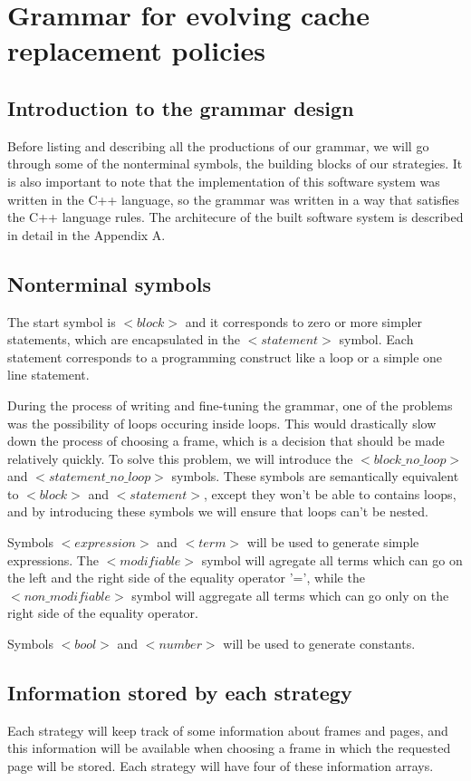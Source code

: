 \section{Grammar for evolving cache replacement policies}
\subsection{Introduction to the grammar design}
Before listing and describing all the productions of our grammar, we will go through some of the nonterminal symbols, the building blocks of our strategies. It is also important to note that the implementation of this software system was written in the C++ language, so the grammar was written in a way that satisfies the C++ language rules. The architecure of the built software system is described in detail in the Appendix A.

\subsection{Nonterminal symbols}
The start symbol is ${<}block{>}$ and it corresponds to zero or more simpler statements, which are encapsulated in the ${<}statement{>}$ symbol. Each statement corresponds to a programming construct like a loop or a simple one line statement.

During the process of writing and fine-tuning the grammar, one of the problems was the possibility of loops occuring inside loops. This would drastically slow down the process of choosing a frame, which is a decision that should be made relatively quickly. To solve this problem, we will introduce the ${<}block\_no\_loop{>}$ and ${<}statement\_no\_loop{>}$ symbols. These symbols are semantically equivalent to ${<}block{>}$ and ${<}statement{>}$, except they won't be able to contains loops, and by introducing these symbols we will ensure that loops can't be nested.

Symbols ${<}expression{>}$ and ${<}term{>}$ will be used to generate simple expressions. The ${<}modifiable{>}$ symbol	 will agregate all terms which can go on the left and the right side of the equality operator '=', while the ${<}non\_modifiable{>}$ symbol will aggregate all terms which can go only on the right side of the equality operator.

Symbols ${<}bool{>}$ and ${<}number{>}$ will be used to generate constants.

\subsection{Information stored by each strategy}
Each strategy will keep track of some information about frames and pages, and this information will be available when choosing a frame in which the requested page will be stored. Each strategy will have four of these information arrays.

